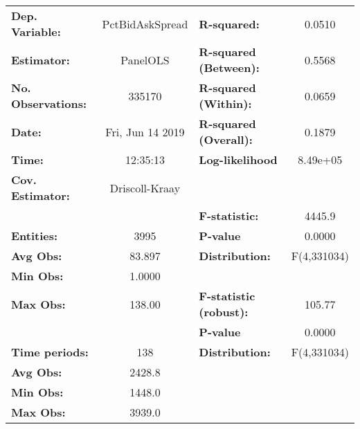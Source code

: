 \begin{center}
\begin{tabular}{lclc}
\toprule
\textbf{Dep. Variable:}                 &  PctBidAskSpread   & \textbf{  R-squared:         }   &      0.0510      \\
\textbf{Estimator:}                     &      PanelOLS      & \textbf{  R-squared (Between):}  &      0.5568      \\
\textbf{No. Observations:}              &       335170       & \textbf{  R-squared (Within):}   &      0.0659      \\
\textbf{Date:}                          &  Fri, Jun 14 2019  & \textbf{  R-squared (Overall):}  &      0.1879      \\
\textbf{Time:}                          &      12:35:13      & \textbf{  Log-likelihood     }   &     8.49e+05     \\
\textbf{Cov. Estimator:}                &   Driscoll-Kraay   & \textbf{                     }   &                  \\
\textbf{}                               &                    & \textbf{  F-statistic:       }   &      4445.9      \\
\textbf{Entities:}                      &        3995        & \textbf{  P-value            }   &      0.0000      \\
\textbf{Avg Obs:}                       &       83.897       & \textbf{  Distribution:      }   &   F(4,331034)    \\
\textbf{Min Obs:}                       &       1.0000       & \textbf{                     }   &                  \\
\textbf{Max Obs:}                       &       138.00       & \textbf{  F-statistic (robust):} &      105.77      \\
\textbf{}                               &                    & \textbf{  P-value            }   &      0.0000      \\
\textbf{Time periods:}                  &        138         & \textbf{  Distribution:      }   &   F(4,331034)    \\
\textbf{Avg Obs:}                       &       2428.8       & \textbf{                     }   &                  \\
\textbf{Min Obs:}                       &       1448.0       & \textbf{                     }   &                  \\
\textbf{Max Obs:}                       &       3939.0       & \textbf{                     }   &                  \\

\end{tabular}
\end{center}
